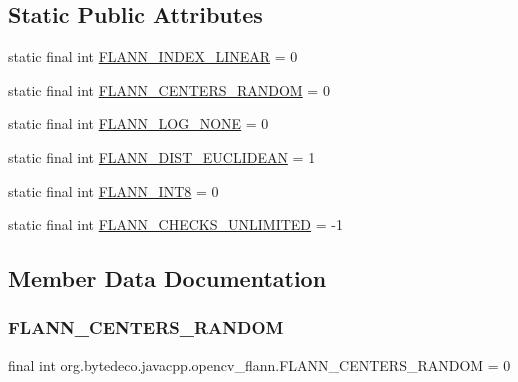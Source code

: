 \subsection*{Static Public Attributes}
\begin{DoxyCompactItemize}
\item 
static final int \hyperlink{classorg_1_1bytedeco_1_1javacpp_1_1opencv__flann_a80b83a1ebca7555000670593d6a0a800}{F\+L\+A\+N\+N\+\_\+\+I\+N\+D\+E\+X\+\_\+\+L\+I\+N\+E\+AR} = 0
\item 
static final int \hyperlink{classorg_1_1bytedeco_1_1javacpp_1_1opencv__flann_ab34e210d13724873f4b44027b519ae3a}{F\+L\+A\+N\+N\+\_\+\+C\+E\+N\+T\+E\+R\+S\+\_\+\+R\+A\+N\+D\+OM} = 0
\item 
static final int \hyperlink{classorg_1_1bytedeco_1_1javacpp_1_1opencv__flann_a4fe44f0983781d82a6e2d00737c18c2f}{F\+L\+A\+N\+N\+\_\+\+L\+O\+G\+\_\+\+N\+O\+NE} = 0
\item 
static final int \hyperlink{classorg_1_1bytedeco_1_1javacpp_1_1opencv__flann_a3b945a10789f97a6082ba476c3e78793}{F\+L\+A\+N\+N\+\_\+\+D\+I\+S\+T\+\_\+\+E\+U\+C\+L\+I\+D\+E\+AN} = 1
\item 
static final int \hyperlink{classorg_1_1bytedeco_1_1javacpp_1_1opencv__flann_ae6e313d1cef55a90ea0d609b7c8545c1}{F\+L\+A\+N\+N\+\_\+\+I\+N\+T8} = 0
\item 
static final int \hyperlink{classorg_1_1bytedeco_1_1javacpp_1_1opencv__flann_a0e34a977ed50ed742297acdf102028ca}{F\+L\+A\+N\+N\+\_\+\+C\+H\+E\+C\+K\+S\+\_\+\+U\+N\+L\+I\+M\+I\+T\+ED} = -\/1
\end{DoxyCompactItemize}


\subsection{Member Data Documentation}
\mbox{\label{classorg_1_1bytedeco_1_1javacpp_1_1opencv__flann_ab34e210d13724873f4b44027b519ae3a}} 
\subsubsection{\texorpdfstring{F\+L\+A\+N\+N\+\_\+\+C\+E\+N\+T\+E\+R\+S\+\_\+\+R\+A\+N\+D\+OM}{FLANN\_CENTERS\_RANDOM}}
{\footnotesize\ttfamily final int org.\+bytedeco.\+javacpp.\+opencv\+\_\+flann.\+F\+L\+A\+N\+N\+\_\+\+C\+E\+N\+T\+E\+R\+S\+\_\+\+R\+A\+N\+D\+OM = 0\hspace{0.3cm}{\ttfamily [static]}}

